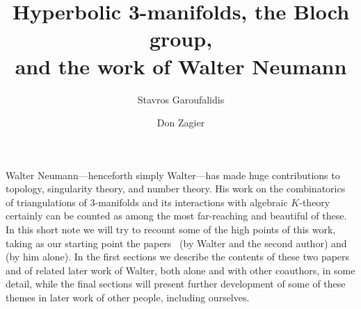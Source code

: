 \documentclass[12pt,reqno]{amsart}
\theoremstyle{definition}
\begin{document}
\title[Hyperbolic 3-manifolds, the Bloch group, and the work of Walter
Neumann]{Hyperbolic 3-manifolds, the Bloch group, \protect
  \\ and the work of Walter Neumann}
\author{Stavros Garoufalidis}
\address{%
  International Center for Mathematics, Department of Mathematics \\
  Southern University of Science and Technology \\
  Shenzhen, China \newline
  {\tt \url{http://people.mpim-bonn.mpg.de/stavros}}}
\author{Don Zagier}
\address{Max Planck Institute for Mathematics \\
  Bonn, Germany and
International Centre for Theoretical Physics \\ Trieste, Italy}



\maketitle

{\footnotesize
\tableofcontents
}


Walter Neumann---henceforth simply Walter---has made huge contributions to
topology, singularity theory, and number theory.  His work on the combinatorics
of triangulations of 3-manifolds and its interactions with algebraic $K$-theory
certainly can be counted as among the most far-reaching and beautiful of these.
In this short note we will try to recount some of the high points of this work,
taking as our starting point the papers~\cite{NZ} (by Walter and the second
author) and~\cite{N:combinatorics} (by him alone). In the first sections we
describe the contents of these two papers and of related later work of 
Walter, both alone and with other coauthors, in some detail, 
while the final sections will present further development of some of these 
themes in later work of other people, including ourselves.
\end{document}
